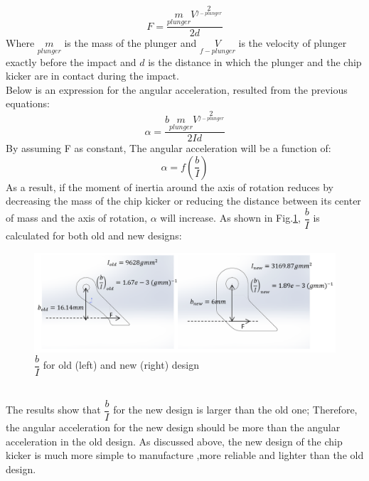 \begin{equation}
F=\dfrac{m\limits_{plunger} {V}^2\limits_{f-plunger}}{2d}
\end{equation}
Where $m\limits_{plunger}$ is the mass of the plunger and ${V}\limits_{f-plunger}$ is the velocity of plunger exactly before the impact and $d$ is the distance in which the plunger and the chip kicker are in contact during the impact.\\
\indent Below is an expression for the angular acceleration, resulted from the previous equations:
\begin{equation}
\alpha = \dfrac{b m\limits_{plunger} {V}^2\limits_{f-plunger}}{2Id}
\end{equation}
By assuming F as constant, The angular acceleration will be a function of:
\begin{equation}
\alpha=f(\dfrac{b}{I})
\end{equation}
As a result, if the moment of inertia around the axis of rotation reduces by decreasing the mass of the chip kicker or reducing the distance between its center of mass and the axis of rotation, $\alpha$ will increase.
As shown in Fig.\ref{fig:CHIP_SIDE_VIEW}, $\dfrac{b}{I}$ is calculated for both old and new designs:\\
\begin{figure}
	\centering
	\includegraphics[width=1.0\textwidth]{images/SIDE_VIEW_CHIP.png}
	\caption{$\dfrac{b}{I}$ for old (left) and new (right) design}
	\label{fig:CHIP_SIDE_VIEW}
\end{figure}\\
The results show that $\dfrac{b}{I}$ for the new design is larger than the old one; Therefore, the angular acceleration for the new design should be more than the angular acceleration in the old design. As discussed above, the new design of the chip kicker is much more simple to manufacture ,more reliable and lighter than the old design. %
\\

